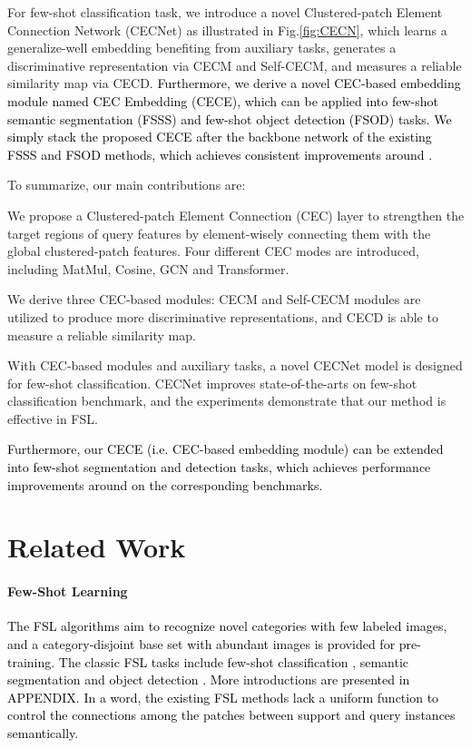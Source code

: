 \documentclass{article}
\newcommand{\jinxiang}[1]{\textcolor{black}{#1}}
\begin{document}
For few-shot classification task, we introduce a novel Clustered-patch Element Connection Network (CECNet) as illustrated in Fig.\ref{fig:CECN}, which learns a generalize-well embedding benefiting from auxiliary tasks, generates a discriminative representation via CECM and Self-CECM, and measures a reliable similarity map via CECD.
\jinxiang{Furthermore, we derive a novel CEC-based embedding module named CEC Embedding (CECE), which can be applied into few-shot semantic segmentation (FSSS) and few-shot object detection (FSOD) tasks.
We simply stack the proposed CECE after the backbone network of the existing FSSS and FSOD methods, which achieves consistent improvements around .}

To summarize, our main contributions are:

 We propose a Clustered-patch Element Connection (CEC) layer to strengthen the target regions of query features by element-wisely connecting them with the global clustered-patch features. Four different CEC modes are introduced, including MatMul, Cosine, GCN and Transformer.

 We derive three CEC-based modules: CECM and Self-CECM modules are utilized to produce more discriminative representations, and CECD is able to measure a reliable similarity map.

 With CEC-based modules and auxiliary tasks, a novel CECNet model is designed for few-shot classification.
CECNet improves state-of-the-arts on few-shot classification benchmark, and the experiments demonstrate that our method is effective in FSL.

 \jinxiang{Furthermore, our CECE (i.e. CEC-based embedding module) can be extended into few-shot segmentation and detection tasks, which achieves performance improvements around  on the corresponding benchmarks.}

\section{Related Work}
\paragraph{Few-Shot Learning}
\jinxiang{The FSL algorithms aim to recognize novel categories with few labeled images, and a category-disjoint base set with abundant images is provided for pre-training.
The classic FSL tasks include few-shot classification \cite{finn2017model,vinyals2016matching,snell2017prototypical,hou2019cross,tian2020rethinking}, semantic segmentation \cite{zhang2020sg,siam2019amp,Malik2021repri} and object detection \cite{kang2019few,wang2020frustratingly,qiao2021defrcn}.
More introductions are presented in APPENDIX.
In a word, the existing FSL methods lack a uniform function to control the connections among the patches between support and query instances semantically.}
\end{document}
